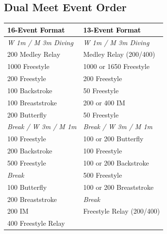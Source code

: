 
\subsection*{Dual Meet Event Order}

\begin{table}[H]
\centering
\renewcommand{\arraystretch}{1.2}
\begin{tabular}{p{7cm} p{7cm}}
\toprule
\rowcolor{teamprimary!25}
\textbf{\textcolor{black}{16-Event Format}} & \textbf{\textcolor{black}{13-Event Format}} \\
\midrule
\rowcolor{teamsecondary!12}
\textit{W 1m / M 3m Diving} & \textit{W 1m / M 3m Diving} \\
\rowcolor{teamprimary!8}
200 Medley Relay & Medley Relay (200/400) \\
\rowcolor{teamsecondary!12}
1000 Freestyle & 1000 or 1650 Freestyle \\
\rowcolor{teamprimary!8}
200 Freestyle & 200 Freestyle \\
\rowcolor{teamsecondary!12}
100 Backstroke & 50 Freestyle \\
\rowcolor{teamprimary!8}
100 Breaststroke & 200 or 400 IM \\
\rowcolor{teamsecondary!12}
200 Butterfly & 50 Freestyle \\
\rowcolor{teamprimary!8}
\textit{Break / W 3m / M 1m} & \textit{Break / W 3m / M 1m} \\
\rowcolor{teamsecondary!12}
100 Freestyle & 100 or 200 Butterfly \\
\rowcolor{teamprimary!8}
200 Backstroke & 100 Freestyle \\
\rowcolor{teamsecondary!12}
500 Freestyle & 100 or 200 Backstroke \\
\rowcolor{teamprimary!8}
\textit{Break} & 500 Freestyle \\
\rowcolor{teamsecondary!12}
100 Butterfly & 100 or 200 Breaststroke \\
\rowcolor{teamprimary!8}
200 Breaststroke & \textit{Break} \\
\rowcolor{teamsecondary!12}
200 IM & Freestyle Relay (200/400) \\
\rowcolor{teamprimary!8}
400 Freestyle Relay &  \\
\bottomrule
\end{tabular}
\end{table}

